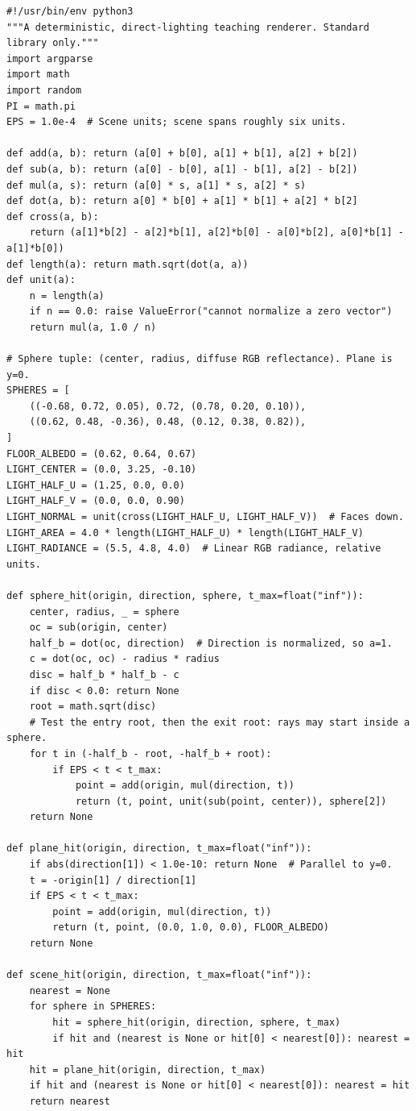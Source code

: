 \begin{verbatim}
#!/usr/bin/env python3
"""A deterministic, direct-lighting teaching renderer. Standard library only."""
import argparse
import math
import random
PI = math.pi
EPS = 1.0e-4  # Scene units; scene spans roughly six units.

def add(a, b): return (a[0] + b[0], a[1] + b[1], a[2] + b[2])
def sub(a, b): return (a[0] - b[0], a[1] - b[1], a[2] - b[2])
def mul(a, s): return (a[0] * s, a[1] * s, a[2] * s)
def dot(a, b): return a[0] * b[0] + a[1] * b[1] + a[2] * b[2]
def cross(a, b):
    return (a[1]*b[2] - a[2]*b[1], a[2]*b[0] - a[0]*b[2], a[0]*b[1] - a[1]*b[0])
def length(a): return math.sqrt(dot(a, a))
def unit(a):
    n = length(a)
    if n == 0.0: raise ValueError("cannot normalize a zero vector")
    return mul(a, 1.0 / n)

# Sphere tuple: (center, radius, diffuse RGB reflectance). Plane is y=0.
SPHERES = [
    ((-0.68, 0.72, 0.05), 0.72, (0.78, 0.20, 0.10)),
    ((0.62, 0.48, -0.36), 0.48, (0.12, 0.38, 0.82)),
]
FLOOR_ALBEDO = (0.62, 0.64, 0.67)
LIGHT_CENTER = (0.0, 3.25, -0.10)
LIGHT_HALF_U = (1.25, 0.0, 0.0)
LIGHT_HALF_V = (0.0, 0.0, 0.90)
LIGHT_NORMAL = unit(cross(LIGHT_HALF_U, LIGHT_HALF_V))  # Faces down.
LIGHT_AREA = 4.0 * length(LIGHT_HALF_U) * length(LIGHT_HALF_V)
LIGHT_RADIANCE = (5.5, 4.8, 4.0)  # Linear RGB radiance, relative units.

def sphere_hit(origin, direction, sphere, t_max=float("inf")):
    center, radius, _ = sphere
    oc = sub(origin, center)
    half_b = dot(oc, direction)  # Direction is normalized, so a=1.
    c = dot(oc, oc) - radius * radius
    disc = half_b * half_b - c
    if disc < 0.0: return None
    root = math.sqrt(disc)
    # Test the entry root, then the exit root: rays may start inside a sphere.
    for t in (-half_b - root, -half_b + root):
        if EPS < t < t_max:
            point = add(origin, mul(direction, t))
            return (t, point, unit(sub(point, center)), sphere[2])
    return None

def plane_hit(origin, direction, t_max=float("inf")):
    if abs(direction[1]) < 1.0e-10: return None  # Parallel to y=0.
    t = -origin[1] / direction[1]
    if EPS < t < t_max:
        point = add(origin, mul(direction, t))
        return (t, point, (0.0, 1.0, 0.0), FLOOR_ALBEDO)
    return None

def scene_hit(origin, direction, t_max=float("inf")):
    nearest = None
    for sphere in SPHERES:
        hit = sphere_hit(origin, direction, sphere, t_max)
        if hit and (nearest is None or hit[0] < nearest[0]): nearest = hit
    hit = plane_hit(origin, direction, t_max)
    if hit and (nearest is None or hit[0] < nearest[0]): nearest = hit
    return nearest


\end{verbatim}
